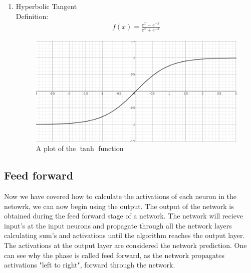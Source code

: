 \documentclass{article}
\begin{document}
\begin{enumerate}
\begin{figure}[H]
\end{figure}
\item Hyperbolic Tangent\\
Definition:
\begin{align*}
f(x) = \frac{e^x - e^{-x}}{e^x + e^{-x}}
\end{align*}
\begin{figure}[H]
\centering
\caption{A plot of the $\tanh$ function}
\includegraphics[scale=0.2]{tanh.png}
\end{figure}
\end{enumerate}

\subsection{Feed forward}
\label{sec:forward}
Now we have covered how to calculate the activations of each neuron in the netowrk, we can now begin using the output. The output of the network is obtained during the feed forward stage of a network. The network will recieve input's at the input neurons and propagate through all the network layers calculating sum's and activations until the algorithm reaches the output layer. The activations at the output layer are considered the network prediction. One can see why the phase is called feed forward, as the network propagates activations "left to right", forward through the network. 
\end{document}
